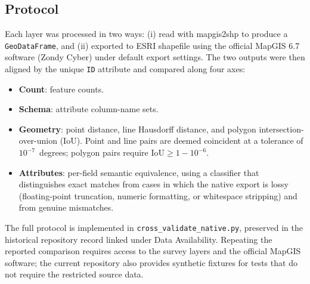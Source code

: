 \documentclass[11pt,a4paper]{article}
\begin{document}
\subsection{Protocol}
Each layer was processed in two ways: (i) read with mapgis2shp to produce a \texttt{GeoDataFrame}, and (ii) exported to ESRI shapefile using the official MapGIS 6.7 software (Zondy Cyber) under default export settings. The two outputs were then aligned by the unique \texttt{ID} attribute and compared along four axes:
\begin{itemize}
  \item \textbf{Count}: feature counts.
  \item \textbf{Schema}: attribute column-name sets.
  \item \textbf{Geometry}: point distance, line Hausdorff distance, and polygon intersection-over-union (IoU). Point and line pairs are deemed coincident at a tolerance of $10^{-7}$~degrees; polygon pairs require $\mathrm{IoU}\geq 1-10^{-6}$.
  \item \textbf{Attributes}: per-field semantic equivalence, using a classifier that distinguishes exact matches from cases in which the native export is lossy (floating-point truncation, numeric formatting, or whitespace stripping) and from genuine mismatches.
\end{itemize}
The full protocol is implemented in \texttt{cross\_validate\_native.py}, preserved in the historical repository record linked under Data Availability. Repeating the reported comparison requires access to the survey layers and the official MapGIS software; the current repository also provides synthetic fixtures for tests that do not require the restricted source data.
\end{document}

